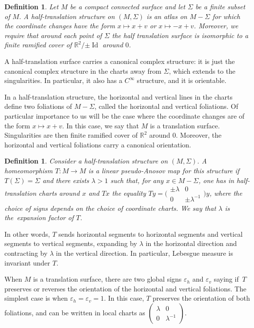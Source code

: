 \documentclass[JEP,XML,SOM,Unicode]{cedram}
\newcommand{\R}{\mathbb{R}}
\DeclareMathOperator{\Id}{Id}
\let\epsilon\varepsilon
\newtheorem{definition}[thm]{Definition}
\theoremstyle{definition}
\numberwithin{equation}{section}
\begin{document}
\begin{definition}
\label{def:half_translation} Let $M$ be a compact connected surface and let
$\Sigma$ be a finite subset of $M$. A half-translation structure on
$(M,\Sigma)$ is an atlas on $M-\Sigma$ for which the coordinate changes have
the form $x \mapsto x+v$ or $x \mapsto -x+v$. Moreover, we require that
around each point of $\Sigma$ the half translation surface is isomorphic to a
finite ramified cover of $\R^2/{\pm \Id}$ around $0$.
\end{definition}
A half-translation surface carries a canonical complex structure: it is just
the canonical complex structure in the charts away from $\Sigma$, which
extends to the singularities. In particular, it also has a $C^\infty$
structure, and it is orientable.

In a half-translation structure, the horizontal and vertical lines in the
charts define two foliations of $M-\Sigma$, called the horizontal and
vertical foliations. Of particular importance to us will be the case where
the coordinate changes are of the form $x \mapsto x + v$. In this case, we
say that $M$ is a translation surface. Singularities are then finite ramified
cover of $\R^2$ around $0$. Moreover, the horizontal and vertical foliations
carry a canonical orientation.

\begin{definition}
Consider a half-translation structure on $(M,\Sigma)$. A homeomorphism
$T:M\to M$ is a linear pseudo-Anosov map for this structure if
$T(\Sigma)=\Sigma$ and there exists $\lambda>1$ such that, for any $x \in
M-\Sigma$, one has in half-translation charts around $x$ and $Tx$ the
equality $T y = \bigl(\begin{smallmatrix} \pm \lambda & 0 \\ 0 & \pm
\lambda^{-1}
\end{smallmatrix}\bigr)y$, where the choice of signs depends on the
choice of coordinate charts. We say that $\lambda$ is the~\emph{expansion
factor} of $T$.
\end{definition}
In other words, $T$ sends horizontal segments to horizontal segments and
vertical segments to vertical segments, expanding by $\lambda$ in the
horizontal direction and contracting by $\lambda$ in the vertical direction.
In particular, Lebesgue measure is invariant under $T$.

When $M$ is a translation surface, there are two global signs $\epsilon_h$
and $\epsilon_v$ saying if~$T$ preserves or reverses the orientation of the
horizontal and vertical foliations. The simplest case is when $\epsilon_h =
\epsilon_v = 1$. In this case, $T$ preserves the orientation of both
foliations, and can be written in local charts as $\left(\begin{smallmatrix}
\lambda & 0 \\ 0 & \lambda^{-1}
\end{smallmatrix}\right)$.
\end{document}
